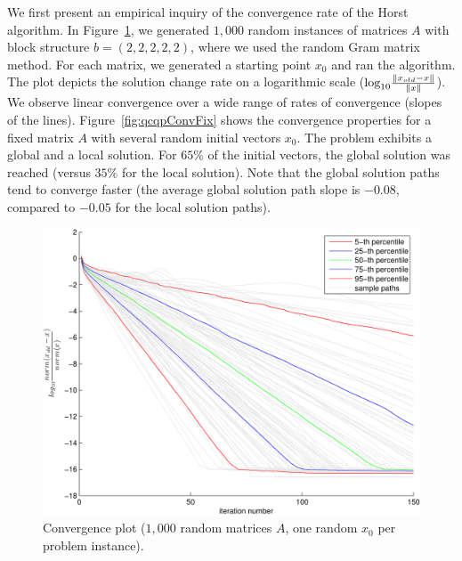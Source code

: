 We first present an empirical inquiry of the convergence rate of the
Horst algorithm. In Figure~\ref{fig:qcqpConvVar}, we
generated $1,000$ random  instances of matrices $A$ with block
structure $b = \left(2,2,2,2,2\right)$, where we used
the random Gram matrix method. For each matrix, we generated
a starting point $x_0$ and ran the algorithm. The plot depicts the
solution change rate on a logarithmic scale ($\text{log}_{10}
\frac{\lVert x_{old} - x\rVert}{\lVert x\rVert}$). We observe linear convergence
over a wide range of rates of convergence (slopes of the
lines). Figure~\ref{fig:qcqpConvFix} shows the convergence properties
for a fixed matrix $A$ with several random initial vectors $x_0$. The
problem exhibits a global and a local solution. For $65\%$ of the initial vectors,
the global solution was reached (versus $35\%$ for the local solution). Note that the global
solution paths tend to converge faster (the average global solution path slope
is  $-0.08$, compared  to $-0.05$ for the local solution paths).

\begin{figure}[htbp]
    \centering
    \includegraphics[width=\textwidth]{figures/convergenceBoxPlotDifferentA.pdf}
    \caption[Convergence rates: varying problem instances]{Convergence plot ($1,000$ random matrices $A$, one random $x_0$ per problem instance).}
    \label{fig:qcqpConvVar}
\end{figure}

